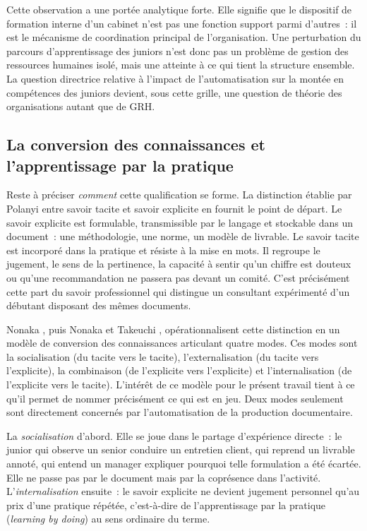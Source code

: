 Cette observation a une portée analytique forte. Elle signifie que le dispositif de
formation interne d'un cabinet n'est pas une fonction support parmi d'autres~: il est le
mécanisme de coordination principal de l'organisation. Une perturbation du parcours
d'apprentissage des juniors n'est donc pas un problème de gestion des ressources humaines
isolé, mais une atteinte à ce qui tient la structure ensemble. La question directrice
relative à l'impact de l'automatisation sur la montée en compétences des juniors devient,
sous cette grille, une question de théorie des organisations autant que de GRH.

\subsection{La conversion des connaissances et l'apprentissage par la pratique}

Reste à préciser \textit{comment} cette qualification se forme. La distinction établie par
Polanyi \cite{polanyi1966} entre savoir tacite et savoir explicite en fournit le point de
départ. Le savoir explicite est formulable, transmissible par le langage et stockable dans
un document~: une méthodologie, une norme, un modèle de livrable. Le savoir tacite est
incorporé dans la pratique et résiste à la mise en mots. Il regroupe le jugement, le sens
de la pertinence, la capacité à sentir qu'un chiffre est douteux ou qu'une recommandation
ne passera pas devant un comité. C'est précisément cette part du savoir professionnel qui
distingue un consultant expérimenté d'un débutant disposant des mêmes documents.

Nonaka \cite{nonaka1994}, puis Nonaka et Takeuchi \cite{nonaka1997}, opérationnalisent
cette distinction en un modèle de conversion des connaissances articulant quatre modes. Ces
modes sont la socialisation (du tacite vers le tacite), l'externalisation (du tacite vers
l'explicite), la combinaison (de l'explicite vers l'explicite) et l'internalisation (de
l'explicite vers le tacite). L'intérêt de ce modèle pour le présent travail tient à ce qu'il permet de nommer
précisément ce qui est en jeu. Deux modes seulement sont directement concernés par
l'automatisation de la production documentaire.

La \textit{socialisation} d'abord. Elle se joue dans le partage d'expérience directe~: le
junior qui observe un senior conduire un entretien client, qui reprend un livrable annoté,
qui entend un manager expliquer pourquoi telle formulation a été écartée. Elle ne passe pas
par le document mais par la coprésence dans l'activité. L'\textit{internalisation} ensuite~:
le savoir explicite ne devient jugement personnel qu'au prix d'une pratique répétée,
c'est-à-dire de l'apprentissage par la pratique (\textit{learning by doing}) au sens
ordinaire du terme.

